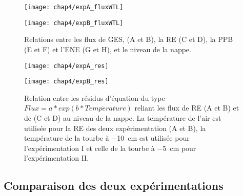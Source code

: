 \begin{figure}
\centering
\begin{minipage}{.5\textwidth}
\centering
\texttt{[image: chap4/expA\_fluxWTL]}
\end{minipage}%
\begin{minipage}{.5\textwidth}
\centering
\texttt{[image: chap4/expB\_fluxWTL]}
\end{minipage}%
\caption{Relations entre les flux de GES, \chh (A et B), la RE (C et D), la PPB (E et F) et l'ENE (G et H), et le niveau de la nappe.}
\label{fig:hm_wtl}
\end{figure}

\begin{figure}[!tbp]
\centering
\hspace*{-2cm}
\begin{minipage}[]{.55\textwidth}
\texttt{[image: chap4/expA\_res]}
\end{minipage}
\hspace*{.1cm}
\begin{minipage}[]{.55\textwidth}
\texttt{[image: chap4/expB\_res]}
\end{minipage}
\hspace*{-2cm}
\caption{Relation entre les résidus d'équation du type $Flux=a*exp(b*Temp\acute{e}rature) $ reliant les flux de RE (A et B) et de \chh (C et D) au niveau de la nappe. La température de l'air est utilisée pour la RE des deux expérimentation (A et B), la température de la tourbe à \SI{-10}{\centi\metre} est utilisée pour l'expérimentation I et celle de la tourbe à \SI{-5}{\centi\metre} pour l'expérimentation II.}
\label{fig:HM_res}
\end{figure}


\subsection{Comparaison des deux expérimentations}


